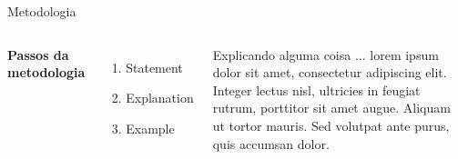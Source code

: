 \begin{frame}{Metodologia}
\begin{columns}[c] %

\textbf{Passos da metodologia}
\begin{enumerate}
\item Statement
\item Explanation
\item Example
\end{enumerate}

Explicando alguma coisa ... lorem ipsum dolor sit amet, consectetur adipiscing elit. Integer lectus nisl, ultricies in feugiat rutrum, porttitor sit amet augue. Aliquam ut tortor mauris. Sed volutpat ante purus, quis accumsan dolor.

\end{columns}
\end{frame}